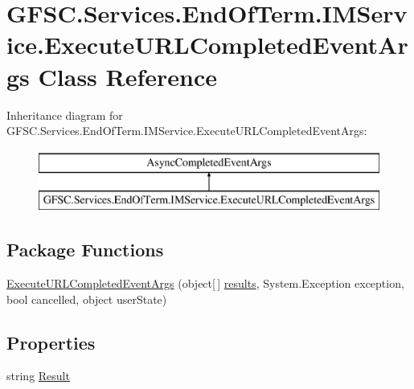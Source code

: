 \hypertarget{class_g_f_s_c_1_1_services_1_1_end_of_term_1_1_i_m_service_1_1_execute_u_r_l_completed_event_args}{}\section{G\+F\+S\+C.\+Services.\+End\+Of\+Term.\+I\+M\+Service.\+Execute\+U\+R\+L\+Completed\+Event\+Args Class Reference}
\label{class_g_f_s_c_1_1_services_1_1_end_of_term_1_1_i_m_service_1_1_execute_u_r_l_completed_event_args}


 


Inheritance diagram for G\+F\+S\+C.\+Services.\+End\+Of\+Term.\+I\+M\+Service.\+Execute\+U\+R\+L\+Completed\+Event\+Args\+:\begin{figure}[H]
\begin{center}
\leavevmode
\includegraphics[height=2.000000cm]{class_g_f_s_c_1_1_services_1_1_end_of_term_1_1_i_m_service_1_1_execute_u_r_l_completed_event_args}
\end{center}
\end{figure}
\subsection*{Package Functions}
\begin{DoxyCompactItemize}
\item 
\mbox{\hyperlink{class_g_f_s_c_1_1_services_1_1_end_of_term_1_1_i_m_service_1_1_execute_u_r_l_completed_event_args_a064d4cd3671c60f5e503ae99317af689}{Execute\+U\+R\+L\+Completed\+Event\+Args}} (object\mbox{[}$\,$\mbox{]} \mbox{\hyperlink{class_g_f_s_c_1_1_services_1_1_end_of_term_1_1_i_m_service_1_1_execute_u_r_l_completed_event_args_af0b5e795afaf8a5ba7f2ba12a1e7e808}{results}}, System.\+Exception exception, bool cancelled, object user\+State)
\end{DoxyCompactItemize}
\subsection*{Properties}
\begin{DoxyCompactItemize}
\item 
string \mbox{\hyperlink{class_g_f_s_c_1_1_services_1_1_end_of_term_1_1_i_m_service_1_1_execute_u_r_l_completed_event_args_a098e43508c318ff14807c75794e0df29}{Result}}
\end{DoxyCompactItemize}
